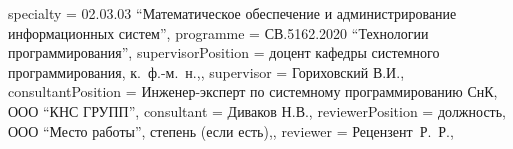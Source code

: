 {    specialty          = {02.03.03 \enquote{Математическое обеспечение и администрирование информационных систем}},
    programme          = {СВ.5162.2020 \enquote{Технологии программирования}},
    supervisorPosition = {доцент кафедры системного программирования, к.~ф.-м.~н.,},
    supervisor         = {Гориховский В.И.},
    consultantPosition = {Инженер-эксперт по системному программированию СнК, ООО \enquote{КНС ГРУПП}},
    consultant         = {Диваков Н.В.},
    reviewerPosition   = {должность, ООО \enquote{Место работы}, степень (если есть),},
    reviewer           = {Рецензент~Р.~Р.},
}

